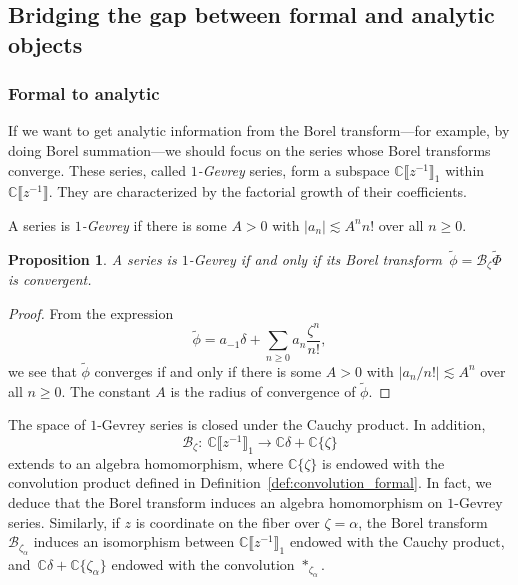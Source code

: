 \documentclass[10pt,a4paper]{amsart}
\newcommand{\maps}{\colon}
\newcommand{\C}{\mathbb{C}}
\newcommand{\series}[1]{\tilde{#1}}
\newcommand{\borel}{\mathcal{B}}
\numberwithin{equation}{section}
\newtheorem{Proposition}[Theorem]{Proposition}
 { \theoremstyle{definition}
\newtheorem{Definition}[Theorem]{Definition}
\newtheorem{Remark}[Theorem]{Remark}
\newtheorem*{notation*}{Notation}
}
\begin{document}
\subsection{Bridging the gap between formal and analytic objects}\label{sec:bridging}

\subsubsection{Formal to analytic}\label{sec:Borel-gevrey}
If we want to get analytic information from the Borel transform---for example, by doing Borel summation---we should focus on the series whose Borel transforms converge. These series, called {\em $1$-Gevrey} series, form a subspace $\C \big\llbracket z^{-1} \big\rrbracket_1$ within $\C \big\llbracket z^{-1} \big\rrbracket$. They are characterized by the factorial growth of their coefficients.
\begin{Definition}
A series
is {\em $1$-Gevrey} if there is some $A > 0$ with $|a_n| \lesssim A^n n!$ over all $n \ge 0$.
\end{Definition}
\begin{Proposition}\label{prop:gevrey_to_convergent}
A series
\smash{$ \series{\Phi} = \sum_{n \ge -1} a_n z^{-n-1}$}
is $1$-Gevrey if and only if its Borel transform~${\series{\phi} = \borel_\zeta \series{\Phi}}$ is convergent.
\end{Proposition}
\begin{proof}
From the expression
\[ \series{\phi} = a_{-1} \delta + \sum_{n \ge 0} a_n \frac{\zeta^n}{n!}, \]
we see that $\series{\phi}$ converges if and only if there is some $A > 0$ with $|a_n / n!| \lesssim A^n$ over all $n \ge 0$. The constant $A$ is the radius of convergence of $\series{\phi}$.
\end{proof}

The space of $1$-Gevrey series is closed under the Cauchy product. In addition,
\[\borel_\zeta\maps\ \C\big\llbracket z^{-1}\big\rrbracket_1\to\C\delta + \C\{\zeta\}\]
extends to an algebra homomorphism, where $\C\{\zeta\}$ is endowed with the convolution product defined in Definition~\ref{def:convolution_formal}. In fact, we deduce that the Borel transform induces an algebra homomorphism on $1$-Gevrey series. Similarly, if $z$ is coordinate on the fiber over $\zeta=\alpha$, the Borel transform $\borel_{\zeta_\alpha}$ induces an isomorphism between $\C\big\llbracket z^{-1}\big\rrbracket_1$ endowed with the Cauchy product, and~${\C\delta+\C\{\zeta_\alpha\}}$ endowed with the convolution $\ast_{\zeta_\alpha}$.
%
\end{document}
